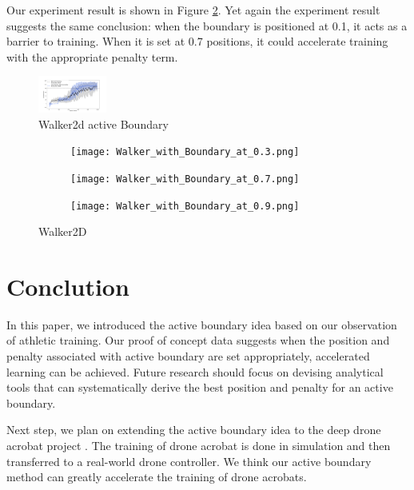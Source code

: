 \documentclass[journal]{IEEEtran}
\begin{document}
Our experiment result is shown in Figure \ref{fig:Walker}. Yet again the experiment result suggests the same conclusion: when the boundary is positioned at 0.1, it acts as a barrier to training. When it is set at 0.7 positions, it could accelerate training with the appropriate penalty term.

\begin{figure}
     \centering
      \includegraphics[width=0.2\textwidth]{walker.png}
      \caption{Walker2d active Boundary}
      \label{fig:walkerPB}
\end{figure}

\begin{figure}
    \centering
    \begin{subfigure}[b]{0.5\textwidth}
      \centering
      \texttt{[image: Walker\_with\_Boundary\_at\_0.3.png]}
    \end{subfigure}
    \vspace*{0.0mm}
    \begin{subfigure}[b]{0.5\textwidth}
      \centering
      \texttt{[image: Walker\_with\_Boundary\_at\_0.7.png]}
    \end{subfigure}
    \vspace*{0.0mm}
    \begin{subfigure}[b]{0.5\textwidth}
      \centering
      \texttt{[image: Walker\_with\_Boundary\_at\_0.9.png]}
    \end{subfigure}
    \caption{Walker2D}
    \label{fig:Walker}
\end{figure}


\section{Conclution}

In this paper, we introduced the active boundary idea based on our observation of athletic training. Our proof of concept data suggests when the position and penalty associated with active boundary are set appropriately, accelerated learning can be achieved. Future research should focus on devising analytical tools that can systematically derive the best position and penalty for an active boundary.

Next step, we plan on extending the active boundary idea to the deep drone acrobat project \cite{Kaufmann2020DeepDA}. The training of drone acrobat is done in simulation and then transferred to a real-world drone controller. We think our active boundary method can greatly accelerate the training of drone acrobats. 
\end{document}
